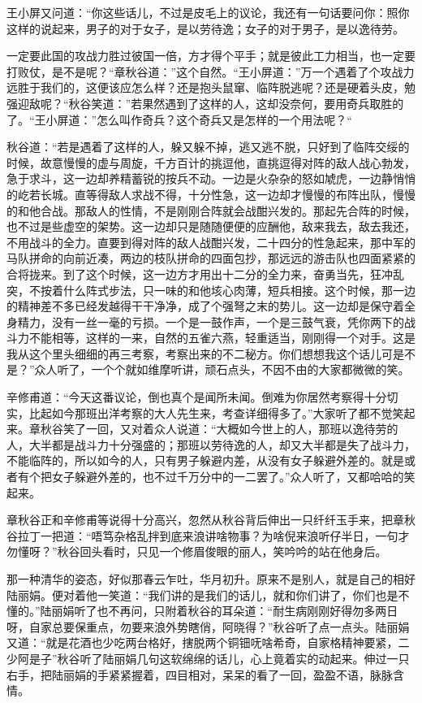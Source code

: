 \documentclass[12pt,UTF8]{ctexbook}
\begin{document}
{{{王小屏又问道：“你这些话儿，不过是皮毛上的议论，我还有一句话要问你：照你这样的说起来，男子的对于女子，是以劳待逸；女子的对于男子，是以逸待劳。

一定要此国的攻战力胜过彼国一倍，方才得个平手；就是彼此工力相当，也一定要打败仗，是不是呢？“章秋谷道：”这个自然。“王小屏道：”万一个遇着了个攻战力远胜于我们的，这便该应怎么样？还是抱头鼠窜、临阵脱逃呢？还是硬着头皮，勉强迎敌呢？“秋谷笑道：”若果然遇到了这样的人，这却没奈何，要用奇兵取胜的了。“王小屏道：”怎么叫作奇兵？这个奇兵又是怎样的一个用法呢？“

秋谷道：“若是遇着了这样的人，躲又躲不掉，逃又逃不脱，只好到了临阵交绥的时候，故意慢慢的虚与周旋，千方百计的挑逗他，直挑逗得对阵的敌人战心勃发，急于求斗，这一边却养精蓄锐的按兵不动。一边是火杂杂的怒如虓虎，一边静悄悄的屹若长城。直等得敌人求战不得，十分性急，这一边却才慢慢的布阵出队，慢慢的和他合战。那敌人的性情，不是刚刚合阵就会战酣兴发的。那起先合阵的时候，也不过是些虚空的架势。这一边却只是随随便便的应酬他，敌来我去，敌去我还，不用战斗的全力。直要到得对阵的敌人战酣兴发，二十四分的性急起来，那中军的马队拼命的向前近凑，两边的枝队拼命的四面包抄，那远远的游击队也四面紧紧的合将拢来。到了这个时候，这一边方才用出十二分的全力来，奋勇当先，狂冲乱突，不按着什么阵式步法，只一味的和他垓心肉薄，短兵相接。这个时候，那一边的精神差不多已经发越得干干净净，成了个强弩之末的势儿。这一边却是保守着全身精力，没有一丝一毫的亏损。一个是一鼓作声，一个是三鼓气衰，凭你两下的战斗力不能相等，这样的一来，自然的五雀六燕，轻重适当，刚刚得一个对手。这是我从这个里头细细的再三考察，考察出来的不二秘方。你们想想我这个话儿可是不是？”众人听了，一个个就如维摩听讲，顽石点头，不因不由的大家都微微的笑。

辛修甫道：“今天这番议论，倒也真个是闻所未闻。倒难为你居然考察得十分切实，比起如今那班出洋考察的大人先生来，考查详细得多了。”大家听了都不觉笑起来。章秋谷笑了一回，又对着众人说道：“大概如今世上的人，那班以逸待劳的人，大半都是战斗力十分强盛的；那班以劳待逸的人，却又大半都是失了战斗力，不能临阵的，所以如今的人，只有男子躲避内差，从没有女子躲避外差的。就是或者有个把女子躲避外差的，也不过千万分中的一二罢了。”众人听了，又都哈哈的笑起来。

章秋谷正和辛修甫等说得十分高兴，忽然从秋谷背后伸出一只纤纤玉手来，把章秋谷拉丁一把道：“唔笃杂格乱拌到底来浪讲啥物事？为啥倪来浪听仔半日，一句才勿懂呀？”秋谷回头看时，只见一个修眉俊眼的丽人，笑吟吟的站在他身后。

那一种清华的姿态，好似那春云乍吐，华月初升。原来不是别人，就是自己的相好陆丽娟。便对着他一笑道：“我们讲的是我们的话儿，就和你们讲了，你们也是不懂的。”陆丽娟听了也不再问，只附着秋谷的耳朵道：“耐生病刚刚好得勿多两日呀，自家总要保重点，勿要来浪外势瞎俏，阿晓得？”秋谷听了点一点头。陆丽娟又道：“就是花酒也少吃两台格好，搳脱两个铜钿呒啥希奇，自家格精神要紧，二少阿是子”秋谷听了陆丽娟几句这软绵绵的话儿，心上竟着实的动起来。伸过一只右手，把陆丽娟的手紧紧握着，四目相对，呆呆的看了一回，盈盈不语，脉脉含情。

}}}
\end{document}
